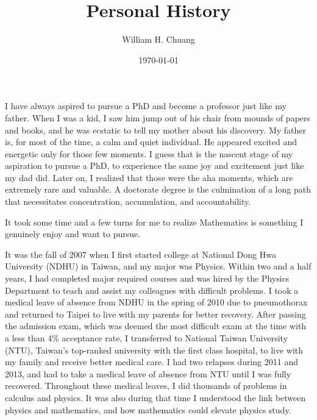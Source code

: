 \documentclass[11pt]{amsart}
\begin{document}
\title{Personal History}
\author{William H. Chuang}
\date{\today}
\maketitle



I have always aspired to pursue a PhD and become a professor just like my father. When I was a kid, I saw him jump out of his chair from mounds of papers and books, and he was ecstatic to tell my mother about his discovery. My father is, for most of the time, a calm and quiet individual. He appeared excited and energetic only for those few moments. I guess that is the nascent stage of my aspiration to pursue a PhD, to experience the same joy and excitement just like my dad did. Later on, I realized that those were the aha moments, which are extremely rare and valuable. A doctorate degree is the culmination of a long path that necessitates concentration, accumulation, and accountability. %



It took some time and a few turns for me to realize Mathematics is something I genuinely enjoy and want to pursue. 

It was the fall of 2007 when I first started college at National Dong Hwa University (NDHU) in Taiwan, and my major was Physics. Within two and a half years, I had completed major required courses and was hired by the Physics Department to teach and assist my colleagues with difficult problems. I took a medical leave of absence from NDHU in the spring of 2010 due to pneumothorax and returned to Taipei to live with my parents for better recovery. After passing the admission exam, which was deemed the most difficult exam at the time with a less than 4$\%$ acceptance rate, I transferred to National Taiwan University (NTU), Taiwan's top-ranked university with the first class hospital, to live with my family and receive better medical care. I had two relapses during 2011 and 2013, and had to take a medical leave of absence from NTU until I was fully recovered. Throughout these medical leaves, I did thousands of problems in calculus and physics. It was also during that time I understood the link between physics and mathematics, and how mathematics could elevate physics study.
\end{document}
